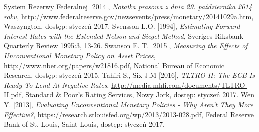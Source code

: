 \begin{thebibliography}{7}
 	System Rezerwy Federalnej [2014],
 	\emph{Notatka prasowa z dnia 29. października 2014 roku},
 	\url{http://www.federalreserve.gov/newsevents/press/monetary/20141029a.htm}, Waszyngton, dostęp: styczeń 2017.
	Svensson L.O. [1994],
	\emph{Estimating Forward Interest Rates with the Extended Nelson and Siegel Method},
	Sveriges Riksbank Quarterly Review 1995:3, 13-26. 
	Swanson E. T. [2015],
	\emph{Measuring the Effects of Unconventional Monetary Policy on Asset Prices}, \url{http://www.nber.org/papers/w21816.pdf}, National Bureau of Economic Research, dostęp: styczeń 2015.
	Tahiri S., Six J.M [2016],
	\emph{TLTRO II: The ECB Is Ready To Lend At Negative Rates}, \url{http://media.mhfi.com/documents/TLTRO-II.pdf}, Standard \& Poor's Rating Services, Nowy Jork, dostęp: styczeń 2017. 	
	Wen Y. [2013],
	\emph{Evaluating Unconventional Monetary Policies - Why Aren't They More Effective?}, \url{https://research.stlouisfed.org/wp/2013/2013-028.pdf}, Federal Reserve Bank of St. Louis, Saint Louis, dostęp: styczeń 2017. 	
\end{thebibliography}
